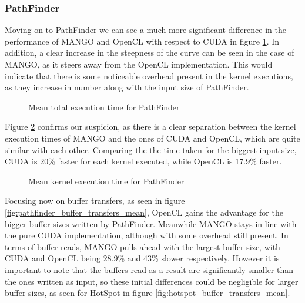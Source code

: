 \subsubsection{PathFinder}

Moving on to PathFinder we can see a much more significant difference in the performance of MANGO and OpenCL with respect to CUDA in figure \ref{fig:pathfinder_total_duration_mean}. In addition, a clear increase in the steepness of the curve can be seen in the case of MANGO, as it steers away from the OpenCL implementation. This would indicate that there is some noticeable overhead present in the kernel executions, as they increase in number along with the input size of PathFinder.

\begin{figure}
    \centering
    \resizebox{!}{160pt}{
        
    }
    \captionsetup{justification=centering}
    \caption{Mean total execution time for PathFinder}
    \label{fig:pathfinder_total_duration_mean}
\end{figure}

Figure \ref{fig:pathfinder_kernel_executions_mean} confirms our suspicion, as there is a clear separation between the kernel execution times of MANGO and the ones of CUDA and OpenCL, which are quite similar with each other. Comparing the the time taken for the biggest input size, CUDA is 20\% faster for each kernel executed, while OpenCL is 17.9\% faster.

\begin{figure}
    \centering
    \resizebox{!}{160pt}{
        
    }
    \captionsetup{justification=centering}
    \caption{Mean kernel execution time for PathFinder}
    \label{fig:pathfinder_kernel_executions_mean}
\end{figure}

Focusing now on buffer transfers, as seen in figure \ref{fig:pathfinder_buffer_transfers_mean}, OpenCL gains the advantage for the bigger buffer sizes written by PathFinder. Meanwhile MANGO stays in line with the pure CUDA implementation, although with some overhead still present. In terms of buffer reads, MANGO pulls ahead with the largest buffer size, with CUDA and OpenCL being 28.9\% and 43\% slower respectively. However it is important to note that the buffers read as a result are significantly smaller than the ones written as input, so these initial differences could be negligible for larger buffer sizes, as seen for HotSpot in figure \ref{fig:hotspot_buffer_transfers_mean}.

